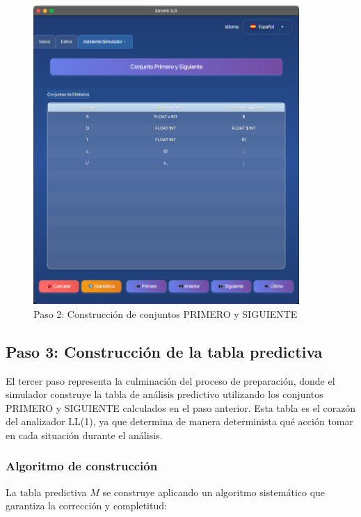 \needspace{8cm}
\begin{figure}[H]
    \centering
    \includegraphics[width=0.9\textwidth]{figuras/simulador/paso2_conjuntos.png}
    \caption{Paso 2: Construcción de conjuntos PRIMERO y SIGUIENTE}
    \label{fig:paso2_conjuntos}
\end{figure}

\subsection{Paso 3: Construcción de la tabla predictiva}

El tercer paso representa la culminación del proceso de preparación, donde el simulador construye la tabla de análisis predictivo utilizando los conjuntos PRIMERO y SIGUIENTE calculados en el paso anterior. Esta tabla es el corazón del analizador LL(1), ya que determina de manera determinista qué acción tomar en cada situación durante el análisis.

\subsubsection{Algoritmo de construcción}

La tabla predictiva $M$ se construye aplicando un algoritmo sistemático que garantiza la corrección y completitud:

